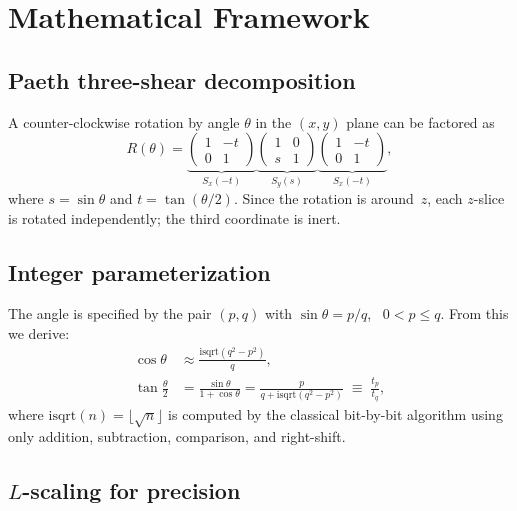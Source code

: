 \documentclass[12pt,a4paper]{article}
\begin{document}
\section{Mathematical Framework}
\label{sec:math}

\subsection{Paeth three-shear decomposition}

A counter-clockwise rotation by angle $\theta$ in the $(x,y)$ plane
can be factored as
\begin{equation}
\label{eq:paeth}
R(\theta)
= \underbrace{\begin{pmatrix}1 & -t\\0 & 1\end{pmatrix}}_{S_x(-t)}
  \underbrace{\begin{pmatrix}1 & 0\\s & 1\end{pmatrix}}_{S_y(s)}
  \underbrace{\begin{pmatrix}1 & -t\\0 & 1\end{pmatrix}}_{S_x(-t)},
\end{equation}
where $s = \sin\theta$ and $t = \tan(\theta/2)$.  Since the
rotation is around~$z$, each $z$-slice is rotated independently;
the third coordinate is inert.

\subsection{Integer parameterization}

The angle is specified by the pair $(p,q)$ with
$\sin\theta = p/q$, \ $0 < p \le q$.  From this we derive:
\begin{align}
\cos\theta &\approx \frac{\mathrm{isqrt}(q^2 - p^2)}{q},
\label{eq:cos}\\[4pt]
\tan\!\tfrac{\theta}{2}
  &= \frac{\sin\theta}{1+\cos\theta}
   = \frac{p}{q + \mathrm{isqrt}(q^2 - p^2)}
   \;\equiv\; \frac{t_p}{t_q},
\label{eq:tan}
\end{align}
where $\mathrm{isqrt}(n) = \lfloor\sqrt{n}\rfloor$ is computed by
the classical bit-by-bit algorithm using only addition, subtraction,
comparison, and right-shift.

\subsection{$L$-scaling for precision}
\label{sec:scaling}
\end{document}
